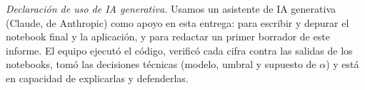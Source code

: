 \documentclass[11pt,letterpaper]{article}
\begin{document}
\noindent\small\textit{Declaración de uso de IA generativa.} Usamos un asistente de IA generativa (Claude, de Anthropic) como apoyo en esta entrega: para escribir y depurar el notebook final y la aplicación, y para redactar un primer borrador de este informe. El equipo ejecutó el código, verificó cada cifra contra las salidas de los notebooks, tomó las decisiones técnicas (modelo, umbral y supuesto de $\alpha$) y está en capacidad de explicarlas y defenderlas.
\end{document}
